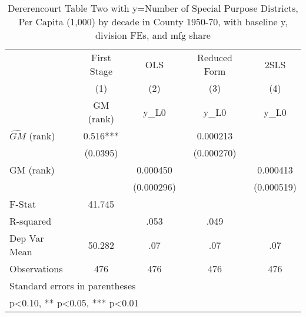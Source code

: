 \begin{table}[htbp]\centering
\def\sym#1{\ifmmode^{#1}\else\(^{#1}\)\fi}
\caption{Dererencourt Table Two with y=Number of Special Purpose Districts, Per Capita (1,000) by decade in County 1950-70, with baseline y, division FEs, and mfg share}
\begin{tabular}{l*{4}{c}}
\toprule
                    & First Stage   &         OLS   &Reduced Form   &        2SLS   \\
                    &\multicolumn{1}{c}{(1)}&\multicolumn{1}{c}{(2)}&\multicolumn{1}{c}{(3)}&\multicolumn{1}{c}{(4)}\\
                    &\multicolumn{1}{c}{GM  (rank)}&\multicolumn{1}{c}{y\_L0}&\multicolumn{1}{c}{y\_L0}&\multicolumn{1}{c}{y\_L0}\\
\midrule
$\hat{GM}$ (rank)   &       0.516***&               &    0.000213   &               \\
                    &    (0.0395)   &               &  (0.000270)   &               \\
\addlinespace
GM  (rank)          &               &    0.000450   &               &    0.000413   \\
                    &               &  (0.000296)   &               &  (0.000519)   \\
\midrule
F-Stat              &      41.745   &               &               &               \\
R-squared           &               &        .053   &        .049   &               \\
Dep Var Mean        &      50.282   &         .07   &         .07   &         .07   \\
Observations        &         476   &         476   &         476   &         476   \\
\bottomrule
\multicolumn{5}{l}{\footnotesize Standard errors in parentheses}\\
\multicolumn{5}{l}{\footnotesize * p<0.10, ** p<0.05, *** p<0.01}\\
\end{tabular}
\end{table}
